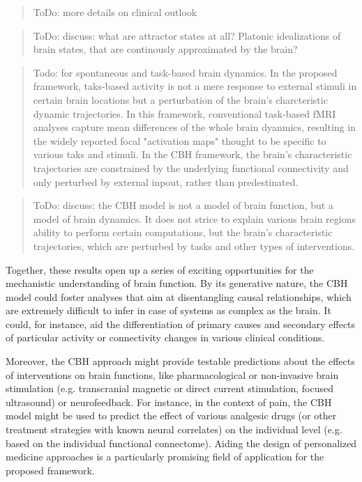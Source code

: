 \documentclass{article}
\begin{document}
\begin{quote}
ToDo: more details on clinical outlook
\end{quote}

\begin{quote}
ToDo: discuss: what are attractor states at all? Platonic idealizations of brain states, that are continously approximated by the brain?
\end{quote}

\begin{quote}
Todo: for spontaneous and task-based brain dynamics. In the proposed framework, taks-based activity is not a mere response to external stimuli in certain brain locations but a perturbation of the brain's charcteristic dynamic trajectories. In this framework, conventional task-based fMRI analyses capture mean differences of the whole brain dyanmics, resulting in the widely reported focal "activation maps" thought to be specific to various taks and stimuli. In the CBH framework, the brain's characteristic trajectories are constrained by the underlying functional connectivity and only perturbed by external inpout, rather than predestinated.
\end{quote}

\begin{quote}
ToDo: discuss: the CBH model is not a model of brain function, but a model of brain dynamics. It does not strice to explain various brain regions ability to perform certain computations, but the brain's characteristic trajectories, which are perturbed by tasks and other types of interventions.
\end{quote}

Together, these results open up a series of exciting opportunities for the mechanistic understanding of brain function.
By its generative nature, the CBH model could foster analyses that aim at disentangling causal relationships, which are
extremely difficult to infer in case of systems as complex as the brain. It could, for instance, aid the differentiation
of primary causes and secondary effects of particular activity or connectivity changes in various clinical conditions.

Moreover, the CBH approach might provide testable predictions about the effects of interventions on brain functions,
like pharmacological or non-invasive brain stimulation (e.g. transcranial magnetic or direct current stimulation,
focused ultrasound) or neurofeedback.
For instance, in the context of pain, the CBH model might be used to predict the effect of various analgesic drugs (or
other treatment strategies with known neural correlates) on the individual level (e.g. based on the individual
functional connectome). Aiding the design of personalized medicine approaches is a particularly promising field of
application for the proposed framework.
\end{document}

